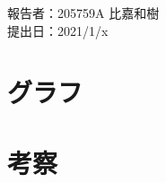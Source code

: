 \documentclass[11pt, a4paper]{jsarticle}
\begin{document}
\noindent
報告者：205759A 比嘉和樹\\
提出日：2021/1/x

\section{グラフ}
\begin{figure}
	\centering
	
\end{figure}
\section{考察}
\end{document}

